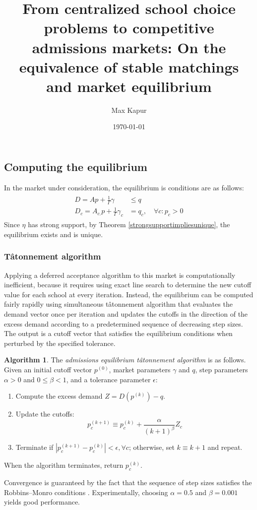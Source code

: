 \documentclass[12pt]{article}
\title{From centralized school choice problems to competitive admissions markets: On the equivalence of stable matchings and market equilibrium}
\date{\today}
\author{Max Kapur}
\theoremstyle{definition}
\newtheorem{algorithm}{Algorithm}
\begin{document}
\subsection{Computing the equilibrium}
In the market under consideration, the equilibrium is conditions are as follows:
\begin{gather} \label{ssmnleqconds}
\begin{aligned}
D = A p + \frac{1}{\Gamma}\gamma &\leq q \\
D_c = A_{c.} p + \frac{1}{\Gamma} \gamma_c &= q_c, \quad \forall c: p_c > 0
\end{aligned}
\end{gather}
Since $\eta$ has strong support, by Theorem \ref{strongsupportimpliesunique}, the equilibrium exists and is unique. 

\subsubsection{T\^{a}tonnement algorithm}
Applying a deferred acceptance algorithm to this market is computationally inefficient, because it requires using exact line search to determine the new cutoff value for each school at every iteration. Instead, the equilibrium can be computed fairly rapidly using simultaneous t\^{a}tonnement algorithm that evaluates the demand vector once per iteration and updates the cutoffs in the direction of the excess demand according to a predetermined sequence of decreasing step sizes. The output is a cutoff vector that satisfies the equilibrium conditions when perturbed by the specified tolerance.
\begin{algorithm} \label{admissionseqtatalgo}
The \emph{admissions equilibrium t\^{a}tonnement algorithm} is as follows. Given an initial cutoff vector $p^{(0)}$, market parameters $\gamma$ and $q$, step parameters $\alpha >0$ and $0 \leq \beta < 1$, and a tolerance parameter $\epsilon$:
\begin{enumerate}
\item Compute the excess demand $Z = D (p^{(k)}) - q$. 
\item Update the cutoffs:
\[ p_c^{(k+1)} \equiv p_c^{(k)} + \frac{\alpha}{(k+1)^\beta} Z_c\]
\item Terminate if $| p_c^{(k+1)} - p_c^{(k)} | < \epsilon, \forall c$; otherwise, set $k \equiv k+1$ and repeat. 
\end{enumerate}
When the algorithm terminates, return $p_c^{(k)}$. 
\end{algorithm}
Convergence is guaranteed by the fact that the sequence of step sizes satisfies the Robbins--Monro conditions \parencite[][]{robbinsmonro}. Experimentally, choosing $\alpha = 0.5$ and $\beta = 0.001$ yields good performance.
\end{document}
